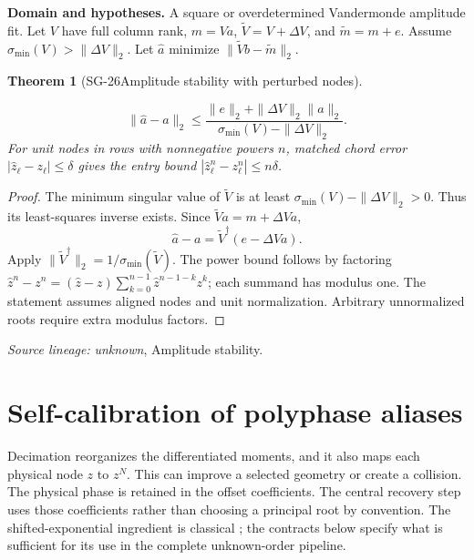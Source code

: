 \documentclass[11pt]{article}
\newtheorem{theorem}{Theorem}[section]
\theoremstyle{definition}\newtheorem{definition}[theorem]{Definition}
\theoremstyle{remark}\newtheorem{remark}[theorem]{Remark}
\begin{document}
\par{\small\textbf{Domain and hypotheses.} A square or overdetermined Vandermonde amplitude fit. Let $V$ have full column rank, $m=Va$, $\widetilde V=V+\Delta V$, and $\widetilde m=m+e$. Assume $\sigma_{\min}(V)>\|\Delta V\|_2$. Let $\widehat a$ minimize $\|\widetilde Vb-\widetilde m\|_2$.}\par
\begin{theorem}[SG-26\quad Amplitude stability with perturbed nodes]\label{SG-26}

\[
 \|\widehat a-a\|_2
 \le\frac{\|e\|_2+\|\Delta V\|_2\|a\|_2}
 {\sigma_{\min}(V)-\|\Delta V\|_2}.
\]
For unit nodes in rows with nonnegative powers $n$, matched chord error
$|\widehat z_\ell-z_\ell|\le\delta$ gives the entry bound
$|\widehat z_\ell^n-z_\ell^n|\le n\delta$.

\end{theorem}
\begin{proof}

The minimum singular value of $\widetilde V$ is at least
$\sigma_{\min}(V)-\|\Delta V\|_2>0$. Thus its least-squares inverse exists.
Since $\widetilde V a=m+\Delta V a$,
\[
 \widehat a-a=\widetilde V^\dagger(e-\Delta V a).
\]
Apply $\|\widetilde V^\dagger\|_2=1/\sigma_{\min}(\widetilde V)$.
The power bound follows by factoring
$\widehat z^n-z^n=(\widehat z-z)\sum_{k=0}^{n-1}\widehat z^{n-1-k}z^k$;
each summand has modulus one. The statement assumes aligned nodes and unit
normalization. Arbitrary unnormalized roots require extra modulus factors.

\end{proof}

\par{\small\color{Teal}\textit{Source lineage:} \textit{unknown}, Amplitude stability.}\par

\section{Self-calibration of polyphase aliases}

Decimation reorganizes the differentiated moments, and it also maps each
physical node $z$ to $z^N$. This can improve a selected geometry or create a
collision. The physical phase is retained in the offset coefficients. The
central recovery step uses those coefficients rather than choosing a principal
root by convention. The shifted-exponential ingredient is classical
\cite{vexpa}; the contracts below specify what is sufficient for its use in
the complete unknown-order pipeline.
\end{document}

